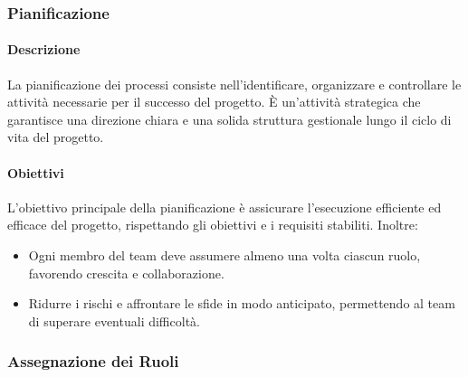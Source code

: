 \subsubsection{Pianificazione}

\paragraph{Descrizione}
La pianificazione dei processi consiste nell'identificare, organizzare e controllare le attività necessarie per il successo del progetto. È un'attività strategica che garantisce una direzione chiara e una solida struttura gestionale lungo il ciclo di vita del progetto.

\paragraph{Obiettivi}
L’obiettivo principale della pianificazione è assicurare l'esecuzione efficiente ed efficace del progetto, rispettando gli obiettivi e i requisiti stabiliti. Inoltre:
\begin{itemize}
    \item Ogni membro del team deve assumere almeno una volta ciascun ruolo, favorendo crescita e collaborazione.
    \item Ridurre i rischi e affrontare le sfide in modo anticipato, permettendo al team di superare eventuali difficoltà.
\end{itemize}

\subsubsection{Assegnazione dei Ruoli}

